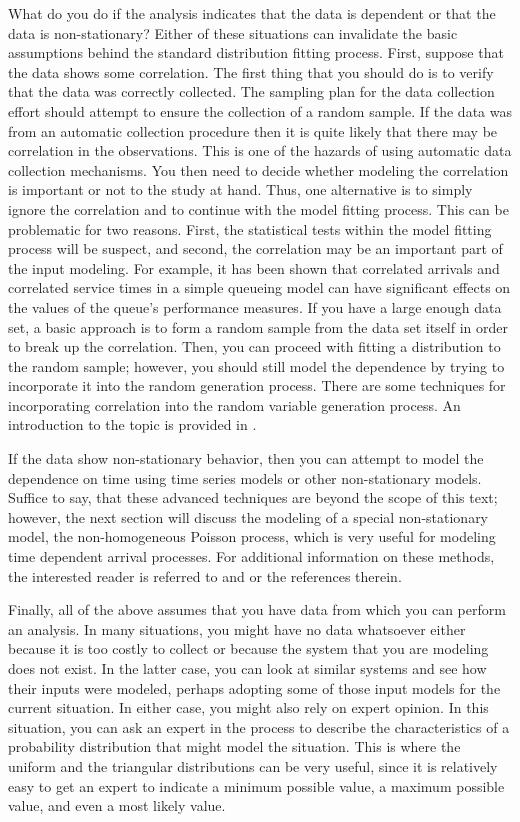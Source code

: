 \documentclass[
]{book}
\theoremstyle{definition}
\theoremstyle{definition}
\theoremstyle{definition}
\theoremstyle{definition}
\theoremstyle{remark}
\begin{document}
What do you do if the analysis indicates that the data is dependent or
that the data is non-stationary? Either of these situations can
invalidate the basic assumptions behind the standard distribution
fitting process. First, suppose that the data shows some correlation.
The first thing that you should do is to verify that the data was
correctly collected. The sampling plan for the data collection effort
should attempt to ensure the collection of a random sample. If the data
was from an automatic collection procedure then it is quite likely that
there may be correlation in the observations. This is one of the hazards
of using automatic data collection mechanisms. You then need to decide
whether modeling the correlation is important or not to the study at
hand. Thus, one alternative is to simply ignore the correlation and to
continue with the model fitting process. This can be problematic for two
reasons. First, the statistical tests within the model fitting process
will be suspect, and second, the correlation may be an important part of
the input modeling. For example, it has been shown that correlated
arrivals and correlated service times in a simple queueing model can
have significant effects on the values of the queue's performance
measures. If you have a large enough data set, a basic approach is to
form a random sample from the data set itself in order to break up the
correlation. Then, you can proceed with fitting a distribution to the
random sample; however, you should still model the dependence by trying
to incorporate it into the random generation process. There are some
techniques for incorporating correlation into the random variable
generation process. An introduction to the topic is provided in \citep{banks2005discreteevent}.

If the data show non-stationary behavior, then you can attempt to model
the dependence on time using time series models or other non-stationary
models. Suffice to say, that these advanced techniques are beyond the
scope of this text; however, the next section will discuss the modeling
of a special non-stationary model, the non-homogeneous Poisson process,
which is very useful for modeling time dependent arrival processes. For
additional information on these methods, the interested reader is
referred to \citep{law2007simulation} and \citep{leemis2006discreteevent} or the
references therein.

Finally, all of the above assumes that you have data from which you can
perform an analysis. In many situations, you might have no data
whatsoever either because it is too costly to collect or because the
system that you are modeling does not exist. In the latter case, you can
look at similar systems and see how their inputs were modeled, perhaps
adopting some of those input models for the current situation. In either
case, you might also rely on expert opinion. In this situation, you can
ask an expert in the process to describe the characteristics of a
probability distribution that might model the situation. This is where
the uniform and the triangular distributions can be very useful, since
it is relatively easy to get an expert to indicate a minimum possible
value, a maximum possible value, and even a most likely value.
\end{document}
